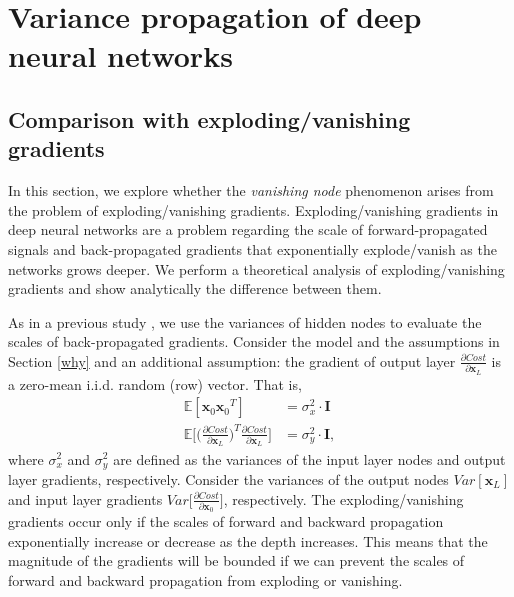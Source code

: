 \chapter{Variance propagation of deep neural networks} \label{compare}

\section{Comparison with exploding/vanishing gradients} \label{comp:compare}

In this section, we explore whether the \textit{vanishing node} phenomenon arises from the problem of  exploding/vanishing gradients. Exploding/vanishing gradients in deep neural networks are a problem regarding the scale of forward-propagated signals and back-propagated gradients that exponentially explode/vanish as the networks grows deeper. We perform a theoretical analysis of exploding/vanishing gradients and show analytically the difference between them.



As in a previous study \cite{xavier}, we use the variances of hidden nodes to evaluate the scales of back-propagated gradients. Consider the model and the assumptions in Section \ref{why} and an additional assumption: the gradient of output layer $\frac{\partial Cost}{\partial \mathbf{x}_L}$ is a zero-mean i.i.d. random (row) vector.
That is,
\begin{equation}
    \begin{aligned}
    \mathbb{E}[\mathbf{x}_0{\mathbf{x}_0}^T] &= \sigma_x^2\cdot\mathbf{I} \\
    \mathbb{E}\Big[\Big(\frac{\partial Cost}{\partial \mathbf{x}_L}\Big)^T\frac{\partial Cost}{\partial \mathbf{x}_L}\Big] 
    &= \sigma_y^2\cdot\mathbf{I},
    \end{aligned}
\end{equation}
where $\sigma_x^2$ and $\sigma_y^2$ are defined as the variances of the input layer nodes and output layer gradients, respectively.
Consider %
the variances of the output nodes $Var[\mathbf{x}_L]$ and input layer gradients $Var\Big[\frac{\partial Cost}{\partial \mathbf{x}_0}\Big]$, respectively.
The exploding/vanishing gradients  occur only if the scales of forward and backward propagation exponentially increase or decrease as the depth increases.
This means that the magnitude of the gradients will be bounded if we can prevent the scales of forward and backward propagation from exploding or vanishing. 

